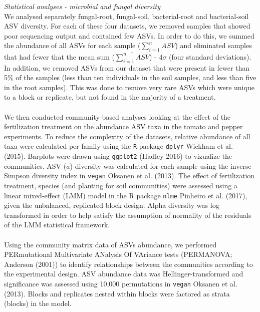 \documentclass[11pt,]{article}
\begin{document}
\emph{Statistical analyses - microbial and fungal diversity}\\
We analysed separately fungal-root, fungal-soil, bacterial-root and
bacterial-soil ASV diversity. For each of these four datasets, we
removed samples that showed poor sequencing output and contained few
ASVs. In order to do this, we summed the abundance of all ASVs for each
sample (\(\sum_{i=1}^n ASV\)) and eliminated samples that had fewer that
the mean sum (\(\overline{\sum_{i=1}^n ASV}\)) - 4\(\sigma\) (four
standard deviations). In addition, we removed ASVs from our dataset that
were present in fewer than 5\% of the samples (less than ten individuals
in the soil samples, and less than five in the root samples). This was
done to remove very rare ASVs which were unique to a block or replicate,
but not found in the majority of a treatment.\\
\hspace*{0.333em}\\
We then conducted community-based analyses looking at the effect of the
fertilization treatment on the abundance ASV taxa in the tomato and
pepper experiments. To reduce the complexity of the datasets, relative
abundance of all taxa were calculated per family using the \texttt{R}
package \texttt{dplyr} Wickham et al. (2015). Barplots were drawn using
\texttt{ggplot2} (Hadley 2016) to vizualize the communities. ASV
(\(a\))-diversity was calculated for each sample using the inverse
Simpson diversity index in \texttt{vegan} Oksanen et al. (2013). The
effect of fertilization treatment, species (and planting for soil
communities) were assessed using a linear mixed-effect (LMM) model in
the R package \texttt{nlme} Pinheiro et al. (2017), given the
unbalanced, replicated block design. Alpha diversity was log transformed
in order to help satisfy the assumption of normality of the residuals of
the LMM statistical framework.\\
\hspace*{0.333em}\\
Using the community matrix data of ASVs abundance, we performed
PERmutational Multivariate ANalysis Of VAriance tests (PERMANOVA;
Anderson (2001)) to identify relationships between the communities
according to the experimental design. ASV abundance data was
Hellinger-transformed and significance was assessed using 10,000
permutations in \texttt{vegan} Oksanen et al. (2013). Blocks and
replicates nested within blocks were factored as strata (blocks) in the
model.\\
\hspace*{0.333em}\\
\end{document}
